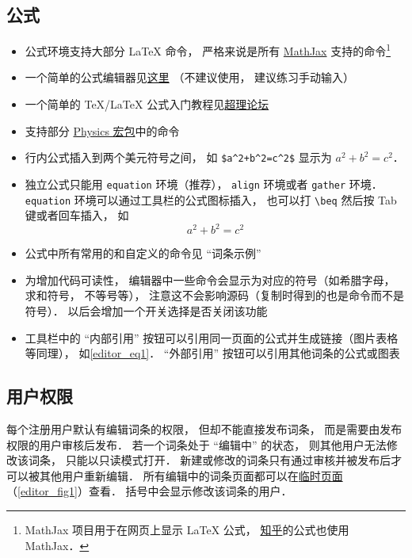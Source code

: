 \subsection{公式}
\begin{itemize}
\item 公式环境支持大部分 LaTeX 命令， 严格来说是所有 \href{https://www.mathjax.org/}{MathJax} 支持的命令\footnote{MathJax 项目用于在网页上显示 LaTeX 公式， \href{https://www.zhihu.com/}{知乎}的公式也使用 MathJax．}
\item 一个简单的公式编辑器见\href{https://www.codecogs.com/latex/eqneditor.php}{这里} （不建议使用， 建议练习手动输入）
\item 一个简单的 TeX/LaTeX 公式入门教程见\href{https://chaoli.club/index.php/211}{超理论坛}
\item 支持部分 \href{http://mirrors.ibiblio.org/CTAN/macros/latex/contrib/physics/physics.pdf}{Physics 宏包}中的命令
\item 行内公式插入到两个美元符号之间， 如 \verb|$a^2+b^2=c^2$| 显示为 $a^2 + b^2 = c^2$．
\item 独立公式只能用 \verb|equation| 环境（推荐）， \verb|align| 环境或者 \verb|gather| 环境． \verb|equation| 环境可以通过工具栏的公式图标插入， 也可以打 \verb|\beq| 然后按 Tab 键或者回车插入， 如
\begin{equation}\label{editor_eq1}
a^2 + b^2 = c^2
\end{equation}
\item 公式中所有常用的和自定义的命令见 “词条示例”
\item 为增加代码可读性， 编辑器中一些命令会显示为对应的符号（如希腊字母， 求和符号， 不等号等）， 注意这不会影响源码（复制时得到的也是命令而不是符号）． 以后会增加一个开关选择是否关闭该功能
\item 工具栏中的 “内部引用” 按钮可以引用同一页面的公式并生成链接（图片表格等同理）， 如\autoref{editor_eq1}． “外部引用” 按钮可以引用其他词条的公式或图表
\end{itemize}

\subsection{用户权限}
每个注册用户默认有编辑词条的权限， 但却不能直接发布词条， 而是需要由发布权限的用户审核后发布． 若一个词条处于 “编辑中” 的状态， 则其他用户无法修改该词条， 只能以只读模式打开． 新建或修改的词条只有通过审核并被发布后才可以被其他用户重新编辑． 所有编辑中的词条页面都可以在\href{http://wuli.wiki/changed/changed.html}{临时页面}（\autoref{editor_fig1}）查看． 括号中会显示修改该词条的用户．

